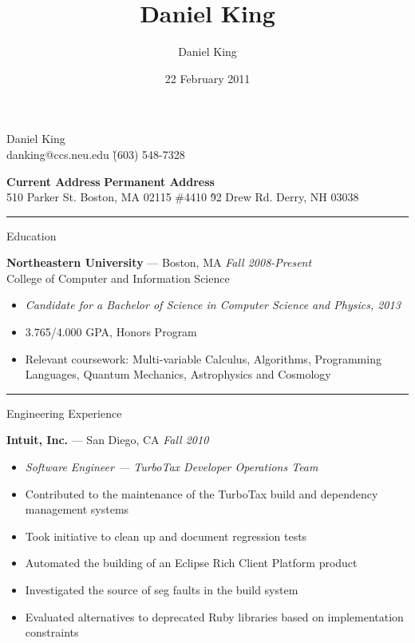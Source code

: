 \documentclass[10pt]{letter}
\author{Daniel King}
\title{Daniel King}
\date{22 February 2011}
\begin{document}
\begin{tabbing}{\Huge Daniel King} \\
\normalsize danking@ccs.neu.edu \`(603) 548-7328
\end{tabbing}

\vspace{-10pt}
\begin{tabbing}
\textbf{Current Address} \`\textbf{Permanent Address}\\
510 Parker St. Boston, MA 02115 \#4410 \`92 Drew Rd. Derry, NH 03038
\end{tabbing}\vspace{-15pt}
\rule{\linewidth}{.5pt}

{\Large Education}
\begin{tabbing}
{\large \bf Northeastern University} --- Boston, MA \` \textit{Fall 2008-Present} \\
College of Computer and Information Science
\end{tabbing}\vspace{-10pt}

\begin{itemize}
\setlength\itemsep{1pt}
\item[] \textit{Candidate for a Bachelor of Science in Computer Science and Physics, 2013}
\item 3.765/4.000 GPA, Honors Program
\item Relevant coursework: Multi-variable Calculus, Algorithms, Programming Languages, Quantum Mechanics, Astrophysics and Cosmology
\end{itemize}

\rule{\linewidth}{.5pt}

{\Large Engineering Experience}
\begin{tabbing}
{\large \bf Intuit, Inc.} --- San Diego, CA \` \textit{Fall 2010}

\end{tabbing}

\begin{itemize}
\setlength\itemsep{1pt}
\item [] \textit{Software Engineer --- TurboTax Developer Operations Team}
\item Contributed to the maintenance of the TurboTax build and dependency management systems
\item Took initiative to clean up and document regression tests
\item Automated the building of an Eclipse Rich Client Platform product
\item Investigated the source of seg faults in the build system
\item Evaluated alternatives to deprecated Ruby libraries based on implementation constraints
\end{itemize}
\end{document}
